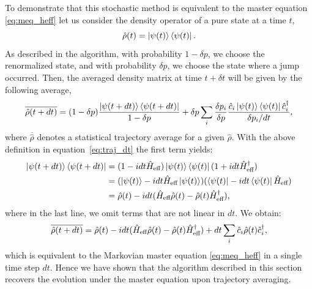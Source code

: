 To demonstrate that this stochastic method is equivalent to the master equation \ref{eq:meq_heff} let us consider the density operator of a pure state at a time $t$,
\begin{equation}
 	\hat{\rho}(t) = \ket{\psi(t)} \bra{\psi(t)}.
\end{equation}
As described in the algorithm, with probability $1-\delta p$, we choose the renormalized state, and with probability $\delta p$, we choose the state where a jump occurred. Then, the averaged density matrix at time $t+\delta t$ will be given by the following average,
\begin{equation}
	\overline{\hat{\rho}(t+dt)} = (1-\delta p) \frac{\ket{\psi(t+dt)} \bra{\psi(t+dt)}}{1-\delta p} + \delta p \sum\limits_i \frac{\delta p_i}{\delta p}  \frac{ \hat{c}_i \ket{\psi(t)} \bra{\psi(t)}\hat{c}^\dagger_i}{\delta p_i/dt},
\end{equation}
where $\overline{\hat{\rho}}$ denotes a statistical trajectory average for a given $\hat{\rho}$. With the above definition in equation~\ref{eq:traj_dt} the first term yields: 
\begin{align}
	\ket{\psi(t+dt)} \bra{\psi(t+dt)} &= (1- i dt \hat{H}_\text{eff} ) \ket{\psi(t)} \bra{\psi(t)} (1+ i dt \hat{H}_\text{eff}^\dagger ) \\
	&= (\ket{\psi(t)} - i dt \hat{H}_\text{eff} \ket{\psi(t)} ) (\bra{\psi(t)} - i dt \bra{\psi(t)} \hat{H}_\text{eff}) \\
	&= \hat{\rho}(t) - i dt (\hat{H}_\text{eff} \hat{\rho}(t) - \hat{\rho}(t) \hat{H}_\text{eff}^\dagger),
\end{align}
where in the last line, we omit terms that are not linear in $dt$. 
We obtain: 
\begin{equation}
	\overline{\hat{\rho}(t+dt)} = \hat{\rho}(t) - i dt (\hat{H}_\text{eff} \hat{\rho}(t) - \hat{\rho}(t) \hat{H}_\text{eff}^\dagger)+ dt \sum\limits_i  \hat{c}_i \hat{\rho}(t) \hat{c}^\dagger_i,
\end{equation}
which is equivalent to the Markovian master equation \ref{eq:meq_heff} in a single time step $dt$. Hence we have shown that the algorithm described in this section recovers the evolution under the master equation upon trajectory averaging. 

